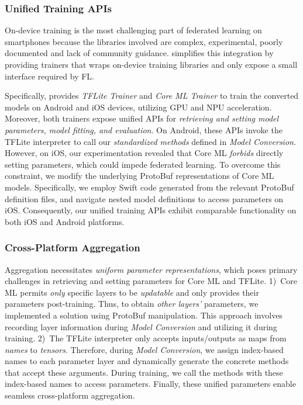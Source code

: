 \subsubsection{Unified Training APIs}
On-device training is the most challenging part of federated learning on
smartphones because the libraries involved are complex, experimental,
poorly documented and lack of community guidance.
\fedkit simplifies this integration by providing trainers
that wraps on-device training libraries and
only expose a small interface required by FL.

Specifically, \fedkit provides \textit{TFLite Trainer}
and \textit{Core ML Trainer}
to train the converted models on Android and iOS devices,
utilizing GPU and NPU acceleration.
Moreover, both trainers expose unified APIs for
\textit{retrieving and setting model parameters,
    model fitting, and evaluation}.
On Android, these APIs invoke the TFLite interpreter to call
our \textit{standardized methods} defined in \textit{Model Conversion}.
However, on iOS, our experimentation revealed that
Core ML \textit{forbids} directly setting parameters, which could impede federated learning.
To overcome this constraint,
we modify the underlying ProtoBuf representations of
Core ML models.
Specifically,
we employ Swift code generated from the relevant ProtoBuf definition files,
and navigate nested model definitions to access parameters on iOS.
Consequently, our unified training APIs exhibit comparable functionality on
both iOS and Android platforms.

\subsubsection{Cross-Platform Aggregation}
Aggregation necessitates
\textit{uniform parameter representations},
which poses primary challenges in
retrieving and setting parameters for Core ML and TFLite.
1)~Core ML permits \textit{only} specific layers to be \textit{updatable} and
only provides their parameters post-training.
Thus, to obtain \textit{other layers'} parameters,
we implemented a solution using ProtoBuf manipulation.
This approach involves recording layer information
during \textit{Model Conversion} and
utilizing it during training.
2)~The TFLite interpreter only accepts inputs/outputs as maps from
\textit{names} to \textit{tensors}.
Therefore, during \textit{Model Conversion},
we assign index-based names to each parameter layer and
dynamically generate the concrete methods that accept these arguments.
During training, we call the methods with these index-based names to
access parameters.
Finally, these unified parameters enable seamless cross-platform aggregation.

